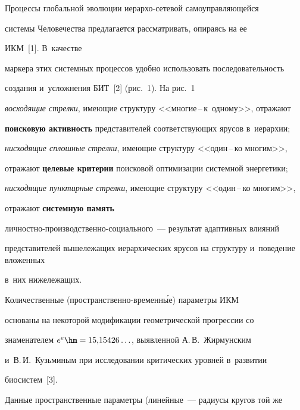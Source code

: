\vspace*{-4pt}











  Процессы глобальной эволюции ие\-рар\-хо-се\-те\-вой самоуправляющейся  


сис\-те\-мы Человечества предлагается рассматривать, опираясь на ее  


ИКМ~[1]. В~качестве 


маркера этих сис\-тем\-ных процессов удобно использовать последовательность 


создания и~услож\-не\-ния БИТ~[2]  (рис.~1). На рис.~1 


\textit{восходящие стрелки}, име\-ющие структуру <<мно\-гие\,--\,к~од\-но\-му>>, отражают 


\textbf{поисковую активность} представителей со\-от\-вет\-ст\-вующих ярусов в~иерархии; 


\textit{нисходящие сплошные стрелки}, име\-ющие структуру <<один\,--\,ко многим>>, 


отражают \textbf{целевые критерии} поисковой оптимизации сис\-те\-мной энергетики; 


\textit{нисходящие пунктирные стрелки}, име\-ющие структуру <<один\,--\,ко многим>>, 


отражают \textbf{сис\-тем\-ную память}  


лич\-ност\-но-про\-из\-вод\-ст\-вен\-но-со\-ци\-аль\-но\-го~--- результат адап\-тив\-ных влияний 


представителей вышележащих иерархических ярусов на структуру и~поведение вложенных 


в~них нижележащих.


  


  Количественные (пространственно-вре\-мен\-н\'{ы}е) параметры ИКМ 


основаны на некоторой модификации геометрической прогрессии со 


знаменателем $e^e\hm= 15{,}15426\ldots$, выявленной А.\,В.~Жирмунским 


и~В.\,И.~Кузьминым при исследовании критических уровней в~развитии 


био\-сис\-тем~[3]. 


  


  Данные пространственные параметры (линейные~--- радиусы кругов той же 


